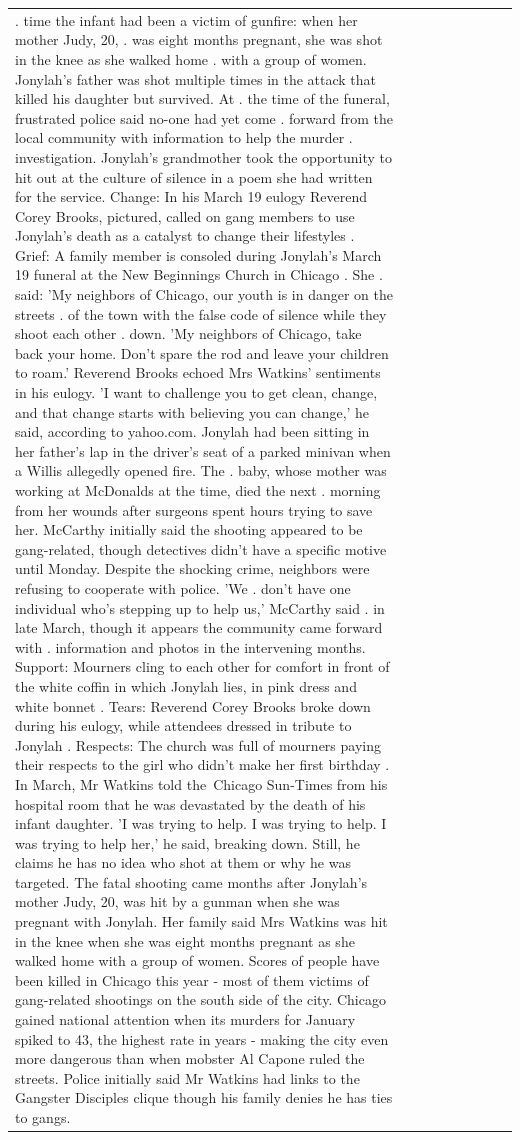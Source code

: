 \begin{table}[H]
\begin{tabular}{lllrlllll}
. time the infant had been a victim of gunfire: when her mother Judy, 20, . was eight months pregnant, she was shot in the knee as she walked home . with a group of women. Jonylah's father was shot multiple times in the attack that killed his daughter but survived. At . the time of the funeral, frustrated police said no-one had yet come . forward from the local community with information to help the murder . investigation. Jonylah's grandmother took the opportunity to hit out at the culture of silence in a poem she had written for the service. Change: In his March 19 eulogy Reverend Corey Brooks, pictured, called on gang members to use Jonylah's death as a catalyst to change their lifestyles . Grief: A family member is consoled during Jonylah's March 19 funeral at the New Beginnings Church in Chicago . She . said: 'My neighbors of Chicago, our youth is in danger on the streets . of the town with the false code of silence while they shoot each other . down. 'My neighbors of Chicago, take back your home. Don't spare the rod and leave your children to roam.' Reverend Brooks echoed Mrs Watkins' sentiments in his eulogy. 'I want to challenge you to get clean, change, and that change starts with believing you can change,' he said, according to yahoo.com. Jonylah had been sitting in her father's lap in the driver's seat of a parked minivan when a Willis allegedly opened fire. The . baby, whose mother was working at McDonalds at the time, died the next . morning from her wounds after surgeons spent hours trying to save her. McCarthy initially said the shooting appeared to be gang-related, though detectives didn't have a specific motive until Monday. Despite the shocking crime, neighbors were refusing to cooperate with police. 'We . don't have one individual who's stepping up to help us,' McCarthy said . in late March, though it appears the community came forward with . information and photos in the intervening months. Support: Mourners cling to each other for comfort in front of the white coffin in which Jonylah lies, in pink dress and white bonnet . Tears: Reverend Corey Brooks broke down during his eulogy, while attendees dressed in tribute to Jonylah . Respects: The church was full of mourners paying their respects to the girl who didn't make her first birthday . In March, Mr Watkins told the Chicago Sun-Times from his hospital room that he was devastated by the death of his infant daughter. 'I was trying to help. I was trying to help. I was trying to help her,' he said, breaking down. Still, he claims he has no idea who shot at them or why he was targeted. The fatal shooting came months after Jonylah's mother Judy, 20, was hit by a gunman when she was pregnant with Jonylah. Her family said Mrs Watkins was hit in the knee when she was eight months pregnant as she walked home with a group of women. Scores of people have been killed in Chicago this year - most of them victims of gang-related shootings on the south side of the city. Chicago gained national attention when its murders for January spiked to 43, the highest rate in years - making the city even more dangerous than when mobster Al Capone ruled the streets. Police initially said Mr Watkins had links to the Gangster Disciples clique though his family denies he has ties to gangs. 
\end{tabular}
\end{table}
